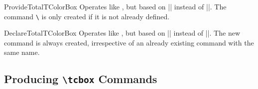 \begin{docCommand}{ProvideTotalTColorBox}{}
  Operates like , but based on |\ProvideDocumentCommand| instead of |\NewDocumentCommand|.
  The command \texttt{\textbackslash} is only created if it is not already defined.
\end{docCommand}

\begin{docCommand}{DeclareTotalTColorBox}{}
  Operates like , but based on |\DeclareDocumentCommand| instead of |\NewDocumentCommand|.
  The new command is always created, irrespective of an already existing
  command with the same name.
\end{docCommand}


\clearpage
\subsection{Producing \texttt{\textbackslash tcbox} Commands}\label{subsec:macros_tcbox}
\enlargethispage*{10mm}

